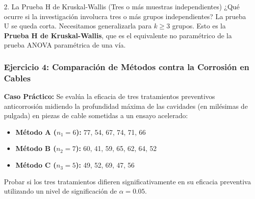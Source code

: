 \documentclass[11pt,a4paper]{article}
\begin{document}
\begin{subsection}{2. La Prueba H de Kruskal-Wallis (Tres o más muestras independientes)}
    ¿Qué ocurre si la investigación involucra tres o más grupos independientes? La prueba U se queda corta. Necesitamos generalizarla para $k \ge 3$ grupos. Esto es la \textbf{Prueba H de Kruskal-Wallis}, que es el equivalente no paramétrico de la prueba ANOVA paramétrica de una vía.

    \subsubsection*{Ejercicio 4: Comparación de Métodos contra la Corrosión en Cables}
    \textbf{Caso Práctico:} Se evalúa la eficacia de tres tratamientos preventivos anticorrosión midiendo la profundidad máxima de las cavidades (en milésimas de pulgada) en piezas de cable sometidas a un ensayo acelerado:
    \begin{itemize}
        \item \textbf{Método A ($n_1 = 6$):} 77, 54, 67, 74, 71, 66
        \item \textbf{Método B ($n_2 = 7$):} 60, 41, 59, 65, 62, 64, 52
        \item \textbf{Método C ($n_3 = 5$):} 49, 52, 69, 47, 56
    \end{itemize}
    Probar si los tres tratamientos difieren significativamente en su eficacia preventiva utilizando un nivel de significación de $\alpha = 0.05$.


\end{subsection}
\end{document}
